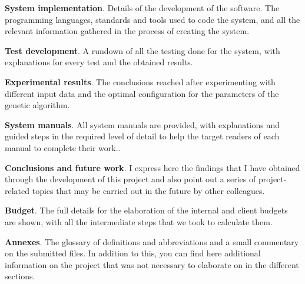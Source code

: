 \begin{description}
    \item \textbf{System implementation}. Details of the development of the software. The programming languages, standards and tools used to code the system, and all the relevant information gathered in the process of creating the system.

    \item \textbf{Test development}. A rundown of all the testing done for the system, with explanations for every test and the obtained results. 

    \item \textbf{Experimental results}. The conclusions reached after experimenting with different input data and the optimal configuration for the parameters of the genetic algorithm. 

    \item \textbf{System manuals}. All system manuals are provided, with explanations and guided steps in the required level of detail to help the target readers of each manual to complete their work..

    \item \textbf{Conclusions and future work}. I express here the findings that I have obtained through the development of this project and also point out a series of project-related topics that may be carried out in the future by other colleagues. 

    \item \textbf{Budget}. The full details for the elaboration of the internal and client budgets are shown, with all the intermediate steps that we took to calculate them. 

    \item \textbf{Annexes}. The glossary of definitions and abbreviations and a small commentary on the submitted files. In addition to this, you can find here additional information on the project that was not necessary to elaborate on in the different sections. 

\end{description}

